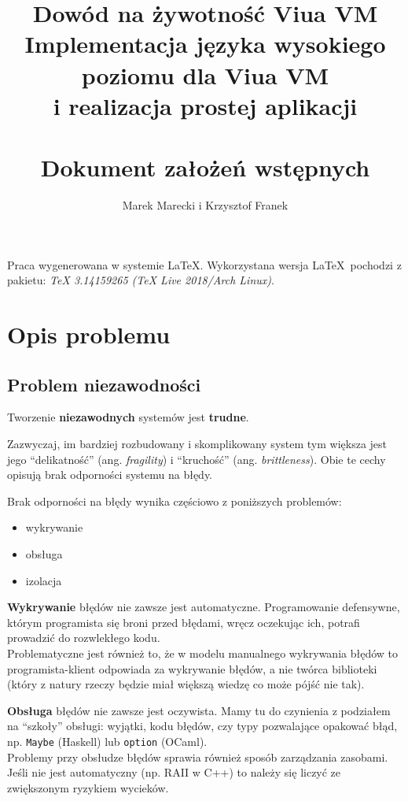\documentclass[11pt,oneside,a4paper,titlepage,onecolumn]{article}
\author{Marek Marecki i Krzysztof Franek}
\title{%
    Dowód na żywotność Viua VM \\
    \large Implementacja języka wysokiego poziomu dla Viua VM \\
    i realizacja prostej aplikacji \\
    ~\\
    Dokument założeń wstępnych}
\begin{document}
\maketitle

Praca wygenerowana w systemie \LaTeX.
Wykorzystana wersja \LaTeX~pochodzi z pakietu: \emph{TeX 3.14159265 (TeX Live 2018/Arch Linux)}.

\tableofcontents

\newpage

\section{Opis problemu}
\label{opis_problemu}

\subsection{Problem niezawodności}

\begin{center}
    Tworzenie \textbf{niezawodnych} systemów jest \textbf{trudne}.
\end{center}

Zazwyczaj, im bardziej rozbudowany i skomplikowany system tym większa jest
jego ``delikatność'' (ang. \emph{fragility}) i ``kruchość'' (ang. \emph{brittleness}).
Obie te cechy opisują brak odporności systemu na błędy.

Brak odporności na błędy wynika częściowo z poniższych problemów:

\begin{itemize}
\item wykrywanie
\item obsługa
\item izolacja
\end{itemize}

\textbf{Wykrywanie} błędów nie zawsze jest automatyczne. Programowanie defensywne, którym
programista się broni przed błędami, wręcz oczekując ich, potrafi prowadzić do rozwlekłego kodu. \\
Problematyczne jest również to, że w modelu manualnego wykrywania błędów to programista-klient
odpowiada za wykrywanie błędów, a nie twórca biblioteki (który z natury rzeczy będzie miał większą
wiedzę co może pójść nie tak).

\textbf{Obsługa} błędów nie zawsze jest oczywista. Mamy tu do czynienia z podziałem na ``szkoły''
obsługi: wyjątki, kodu błędów, czy typy pozwalające opakować błąd, np. \texttt{Maybe} (Haskell) lub
\texttt{option} (OCaml). \\
Problemy przy obsłudze błędów sprawia również sposób zarządzania zasobami. Jeśli nie jest
automatyczny (np. RAII w C++) to należy się liczyć ze zwiększonym ryzykiem wycieków.
\end{document}
